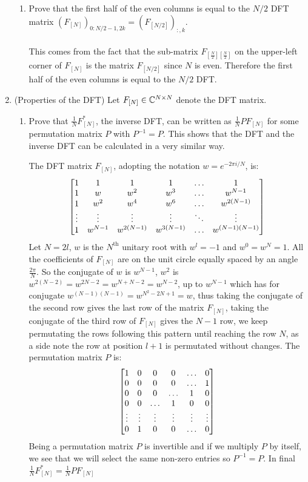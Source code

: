 \documentclass[12pt,twoside]{article}
\begin{document}
\begin{enumerate}
\begin{enumerate}
  \item Prove  that  the  first  half  of  the  even  columns  is  equal to  the $N/2$ DFT matrix $(F_{[N]})_{0:N/2-1,2k} = (F_{[N/2]})_{:,k}$.\\ \\
  This comes from the fact that the sub-matrix $F_{[\frac{N}{2}][\frac{N}{2}]}$ on the upper-left corner of $F_{[N]}$ is the matrix $F_{[N/2]}$ since $N$ is even.
  Therefore the first half of the even columns is  equal to  the $N/2$ DFT.
   
   \end{enumerate}
 
 \newpage
 \item (Properties of the DFT)
  Let $F_{[N]}\in\mathbb{C}^{N\times N}$ denote the DFT matrix.
  \begin{enumerate}
  \item Prove that $\frac{1}{N}F_{[N]}^*$, the inverse DFT, can be
    written as $\frac{1}{N}PF_{[N]}$ for some permutation matrix $P$
    with $P^{-1}=P$.  This shows that the DFT and the inverse DFT can be
    calculated in a very similar way.
    
    The DFT matrix $F_{[N]}$, adopting the notation $w = e^{-2\pi i /N}$, is:
    $$
    \begin{bmatrix} 
    1 & 1 & 1 & 1 & \ldots & 1 \\
    1 & w & w^2 & w^3 & \ldots & w^{N-1} \\
    1 & w^2 & w^4 & w^6 & \ldots & w^{2 (N-1)} \\
    \vdots & \vdots & \vdots & \vdots & \ddots & \vdots \\
    1 & w^{N-1}	& w^{2(N-1)} & w^{3 (N-1)} & \ldots & w^{(N-1) (N-1)}	\\
     \end{bmatrix}
    $$
   Let $N=2l$,  $w$ is the $N^{\text{th}}$ unitary root with $w^l = -1$ and  $w^0 = w^N = 1$. All the coefficients of $F_{[N]}$ are on the unit circle equally spaced by an angle $\frac{2\pi}{N}$.
   So the conjugate of $w$ is $w^{N-1}$, $w^2$ is $w^{2 (N-2)} = w^{2N-2} = w^{N + N-2} = w^{N-2}$, up to $w^{N-1}$ which has for conjugate $w^{(N-1)(N-1)} = w^{N^2-2N+1} = w$, 
   thus taking the conjugate of the second row  gives the last row of the matrix $F_{[N]}$, 
   taking the conjugate of the third row of $F_{[N]}$ gives the $N-1$ row, 
   we keep permutating the rows following this pattern until reaching the row $N$, as a side note the row at position $l+1$ is permutated without changes.
   The permutation matrix $P$ is:
       $$
    \begin{bmatrix} 
    1 & 0 & 0 & 0 & \ldots & 0 \\
    0 & 0 & 0 & 0 & \ldots & 1 \\
    0 & 0 & 0 & \ldots & 1 & 0 \\
    0 & 0 & \ldots & 1 & 0 & 0 \\
    \vdots & \vdots & \vdots & \vdots & \vdots & \vdots\\
    0 & 1	& 0 & 0 & \ldots & 0	\\
     \end{bmatrix}
    $$
    Being a permutation matrix $P$ is invertible and if we multiply $P$ by itself, we see that  we will select the same non-zero entries so $P^{-1}=P$.
    In final $\frac{1}{N}F_{[N]}^* = \frac{1}{N}PF_{[N]}$
   

\end{enumerate}
\end{enumerate}
\end{document}
